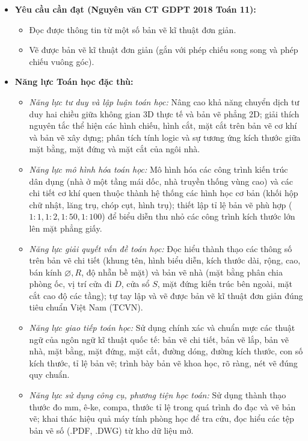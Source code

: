\documentclass[12pt, a4paper]{article}
\begin{document}
\begin{itemize}[leftmargin=1.2cm]
    \item \textbf{Yêu cầu cần đạt (Nguyên văn CT GDPT 2018 Toán 11):}
    \begin{itemize}[leftmargin=0.6cm]
        \item Đọc được thông tin từ một số bản vẽ kĩ thuật đơn giản.
        \item Vẽ được bản vẽ kĩ thuật đơn giản (gắn với phép chiếu song song và phép chiếu vuông góc).
    \end{itemize}

    \item \textbf{Năng lực Toán học đặc thù:}
    \begin{itemize}[leftmargin=0.6cm]
        \item \textit{Năng lực tư duy và lập luận toán học:} Nâng cao khả năng chuyển dịch tư duy hai chiều giữa không gian 3D thực tế và bản vẽ phẳng 2D; giải thích nguyên tắc thể hiện các hình chiếu, hình cắt, mặt cắt trên bản vẽ cơ khí và bản vẽ xây dựng; phân tích tính logic và sự tương ứng kích thước giữa mặt bằng, mặt đứng và mặt cắt của ngôi nhà.
        \item \textit{Năng lực mô hình hóa toán học:} Mô hình hóa các công trình kiến trúc dân dụng (nhà ở một tầng mái dốc, nhà truyền thống vùng cao) và các chi tiết cơ khí quen thuộc thành hệ thống các hình học cơ bản (khối hộp chữ nhật, lăng trụ, chóp cụt, hình trụ); thiết lập tỉ lệ bản vẽ phù hợp ($1:1, 1:2, 1:50, 1:100$) để biểu diễn thu nhỏ các công trình kích thước lớn lên mặt phẳng giấy.
        \item \textit{Năng lực giải quyết vấn đề toán học:} Đọc hiểu thành thạo các thông số trên bản vẽ chi tiết (khung tên, hình biểu diễn, kích thước dài, rộng, cao, bán kính $\varnothing, R$, độ nhẵn bề mặt) và bản vẽ nhà (mặt bằng phân chia phòng ốc, vị trí cửa đi $D$, cửa sổ $S$, mặt đứng kiến trúc bên ngoài, mặt cắt cao độ các tầng); tự tay lập và vẽ được bản vẽ kĩ thuật đơn giản đúng tiêu chuẩn Việt Nam (TCVN).
        \item \textit{Năng lực giao tiếp toán học:} Sử dụng chính xác và chuẩn mực các thuật ngữ của ngôn ngữ kĩ thuật quốc tế: bản vẽ chi tiết, bản vẽ lắp, bản vẽ nhà, mặt bằng, mặt đứng, mặt cắt, đường dóng, đường kích thước, con số kích thước, tỉ lệ bản vẽ; trình bày bản vẽ khoa học, rõ ràng, nét vẽ đúng quy chuẩn.
        \item \textit{Năng lực sử dụng công cụ, phương tiện học toán:} Sử dụng thành thạo thước đo mm, ê-ke, compa, thước tỉ lệ trong quá trình đo đạc và vẽ bản vẽ; khai thác hiệu quả máy tính phòng học để tra cứu, đọc hiểu các tệp bản vẽ số (.PDF, .DWG) từ kho dữ liệu mở.
    \end{itemize}


\end{itemize}
\end{document}
